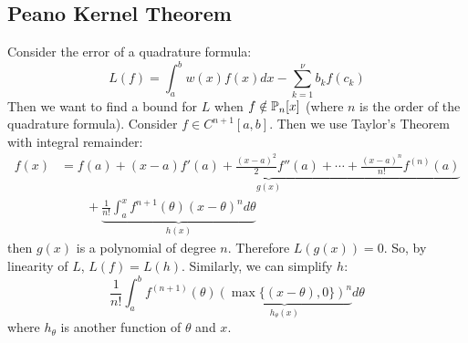 \documentclass[../Main.tex]{subfiles}
\begin{document}
\subsection{Peano Kernel Theorem}
Consider the error of a quadrature formula:
\begin{equation*}
    L(f) = \int_{a}^{b} w(x) f(x) dx - \sum_{k=1}^{\nu} b_k f(c_k)
\end{equation*}
Then we want to find a bound for $L$ when $f \notin \P_n[x]$ (where $n$ is the order of the quadrature formula).
Consider $f \in C^{n+1}[a, b]$. Then we use Taylor's Theorem with integral remainder:
\begin{align*}
    f(x) &= \underbrace{f(a) + (x - a) f'(a) + \frac{(x-a)^2}{2} f''(a) + \cdots + \frac{(x-a)^n}{n!} f^{(n)} (a)}_{g(x)}\\
    &\qquad+ \underbrace{\frac{1}{n!} \int_{a}^{x} f^{n+1}(\theta)(x - \theta)^n d\theta}_{h(x)}
\end{align*}
then $g(x)$ is a polynomial of degree $n$. Therefore $L(g(x)) = 0$. So, by linearity of $L$, $L(f) = L(h)$. Similarly, we can simplify $h$:
\begin{equation*}
    \frac{1}{n!} \int_{a}^{b} f^{(n+1)}(\theta) \underbrace{\left(\max\{(x - \theta), 0\}\right)^n}_{h_\theta(x)} d\theta
\end{equation*}
where $h_\theta$ is another function of $\theta$ and $x$.
\end{document}
